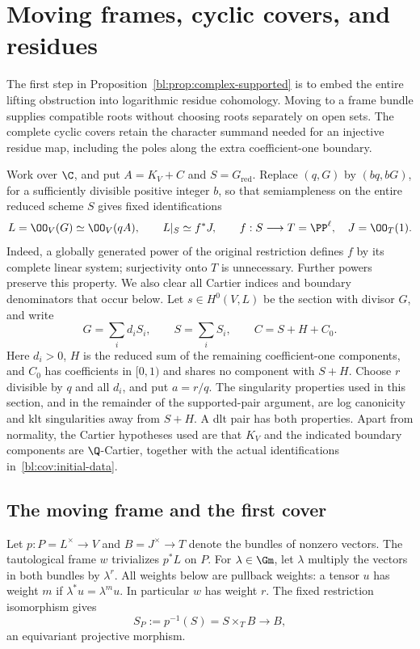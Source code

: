 \section{Moving frames, cyclic covers, and residues}
\label{bl:cov:section}
\label{bl:sec:covers}

The first step in Proposition~\ref{bl:prop:complex-supported} is to
embed the entire lifting obstruction into logarithmic residue
cohomology. Moving to a frame bundle supplies compatible roots without
choosing roots separately on open sets. The complete cyclic covers
retain the character summand needed for an injective residue map,
including the poles along the extra coefficient-one boundary.

Work over $\C$, and put $A=K_V+C$ and $S=G_{\mathrm{red}}$.
Replace $(q,G)$ by
$(bq,bG)$, for a sufficiently divisible positive integer $b$, so that
semiampleness on the entire reduced scheme $S$ gives fixed identifications
\begin{equation}\label{bl:cov:initial-data}
 L=\OO_V(G)\simeq\OO_V(qA),\qquad
 L|_S\simeq f^*J,\qquad
 f:S\longrightarrow T=\PP^\ell,\quad J=\OO_T(1).
\end{equation}
Indeed, a globally generated power of the original restriction defines
$f$ by its complete linear system; surjectivity onto $T$ is unnecessary.
Further powers preserve this property.  We also clear all Cartier indices
and boundary denominators that occur below.  Let $s\in H^0(V,L)$ be the
section with divisor $G$, and write
\[
 G=\sum_i d_iS_i,\qquad S=\sum_iS_i,\qquad C=S+H+C_0.
\]
Here $d_i>0$, $H$ is the reduced sum of the remaining coefficient-one
components, and $C_0$ has coefficients in $[0,1)$ and shares no component
with $S+H$.  Choose $r$ divisible by $q$ and all $d_i$, and put $a=r/q$.
The singularity properties used in this section, and in the remainder of
the supported-pair argument, are log canonicity and klt singularities away
from $S+H$.  A dlt pair has both properties.  Apart from normality, the
Cartier hypotheses used are that $K_V$ and the indicated boundary
components are $\Q$-Cartier, together with the actual identifications
in~\eqref{bl:cov:initial-data}.

\subsection{The moving frame and the first cover}

Let $p:P=L^\times\to V$ and $B=J^\times\to T$ denote the bundles of
nonzero vectors.  The tautological frame $w$ trivializes $p^*L$ on $P$.
For $\lambda\in\Gm$, let $\lambda$ multiply the vectors in both bundles
by $\lambda^r$.  All weights below are pullback weights: a tensor $u$
has weight $m$ if $\lambda^*u=\lambda^m u$.  In particular $w$ has
weight $r$.  The fixed restriction isomorphism gives
\[
 S_P:=p^{-1}(S)=S\times_TB\longrightarrow B,
\]
an equivariant projective morphism.

